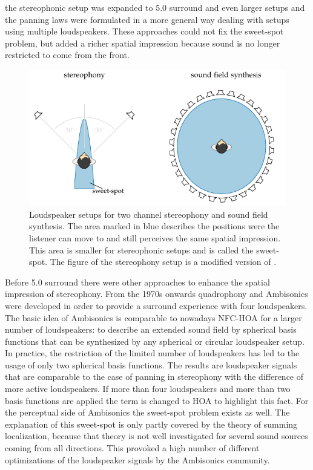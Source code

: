  the stereophonic setup was expanded to 5.0 surround
and even larger setups and the panning laws were
formulated in a more general way dealing with setups using multiple
loudspeakers.
These approaches could not fix the sweet-spot problem, but added a richer
spatial impression because sound is no longer restricted to come from the front.
%
\begin{figure}[t]
    \centering
    \includegraphics{fig1_04/fig1_04}
    \caption{Loudspeaker setups for two channel stereophony
    and sound field synthesis. The area marked in blue describes the positions were the
    listener can move to and still perceives the same spatial impression. This
    area is smaller for stereophonic setups and is called the
    sweet-spot. The figure of the stereophony setup is a modified version of
    \cite[][Fig.\,1.1]{Ahrens2012}.
    }
    \label{fig:stereophony}
\end{figure}

Before 5.0 surround there were other approaches to enhance the spatial impression of
stereophony. From the 1970s onwards quadro\-phony and
Ambisonics\autocite{Gerzon1973} were developed in
order to provide a surround experience with four loudspeakers. The basic idea of
Ambisonics is comparable to nowadays \ac{NFC-HOA} for
a larger number of loudspeakers: to describe an extended sound field by spherical
basis functions that can be synthesized by any spherical or circular loudspeaker
setup. In practice, the restriction of the limited number of loudspeakers has led to the usage
of only two spherical basis functions. The results are
loudspeaker signals that are comparable to the case of panning in
stereophony with the difference of more active
loudspeakers.\autocite[E.g.][]{Frank2013}
If more than four loudspeakers and more than two basis functions
are applied the term is changed to \ac{HOA} to highlight this fact.
For the perceptual side of Ambisonics the sweet-spot problem exists as well.
The explanation of this sweet-spot is only partly covered by the
theory of summing localization, because that theory is not well investigated for
several sound sources coming from all directions. This provoked a high number of
different optimizations of the loudspeaker signals by the Ambisonics community.


